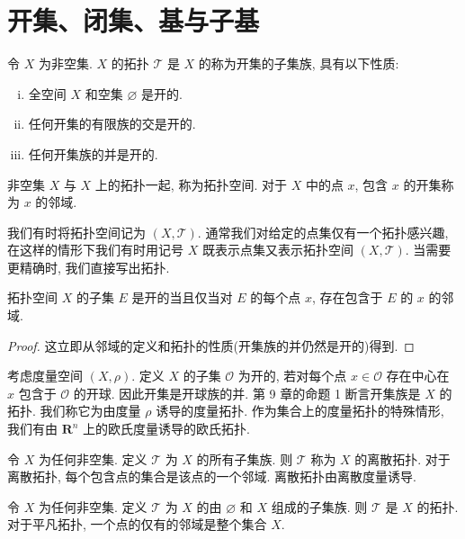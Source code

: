 \documentclass[../../main.tex]{subfiles}
\begin{document}
\section{开集、闭集、基与子基}\label{section:ch11-开集闭集基子基}

\begin{definition}[拓扑空间]\label{definition:ch11-拓扑空间}
令 $X$ 为非空集. $X$ 的拓扑 $\mathcal{T}$ 是 $X$ 的称为开集的子集族, 具有以下性质:
\begin{enumerate}[(i)]
\item 全空间 $X$ 和空集 $\varnothing$ 是开的.
\item 任何开集的有限族的交是开的.
\item 任何开集族的并是开的.
\end{enumerate}
非空集 $X$ 与 $X$ 上的拓扑一起, 称为拓扑空间. 对于 $X$ 中的点 $x$, 包含 $x$ 的开集称为 $x$ 的邻域.
\end{definition}

我们有时将拓扑空间记为 $(X,\mathcal{T})$. 通常我们对给定的点集仅有一个拓扑感兴趣, 在这样的情形下我们有时用记号 $X$ 既表示点集又表示拓扑空间 $(X,\mathcal{T})$. 当需要更精确时, 我们直接写出拓扑.

\begin{proposition}\label{proposition:ch11-开集邻域}
拓扑空间 $X$ 的子集 $E$ 是开的当且仅当对 $E$ 的每个点 $x$, 存在包含于 $E$ 的 $x$ 的邻域.
\end{proposition}

\begin{proof}
这立即从邻域的定义和拓扑的性质(开集族的并仍然是开的)得到.
\end{proof}

\begin{example}[度量拓扑]\label{example:ch11-度量拓扑}
考虑度量空间 $(X,\rho)$. 定义 $X$ 的子集 $\mathcal{O}$ 为开的, 若对每个点 $x\in\mathcal{O}$ 存在中心在 $x$ 包含于 $\mathcal{O}$ 的开球. 因此开集是开球族的并. 第 9 章的命题 1 断言开集族是 $X$ 的拓扑. 我们称它为由度量 $\rho$ 诱导的度量拓扑. 作为集合上的度量拓扑的特殊情形, 我们有由 $\mathbf{R}^{n}$ 上的欧氏度量诱导的欧氏拓扑.
\end{example}

\begin{example}[离散拓扑]\label{example:ch11-离散拓扑}
令 $X$ 为任何非空集. 定义 $\mathcal{T}$ 为 $X$ 的所有子集族. 则 $\mathcal{T}$ 称为 $X$ 的离散拓扑. 对于离散拓扑, 每个包含点的集合是该点的一个邻域. 离散拓扑由离散度量诱导.
\end{example}

\begin{example}[平凡拓扑]\label{example:ch11-平凡拓扑}
令 $X$ 为任何非空集. 定义 $\mathcal{T}$ 为 $X$ 的由 $\varnothing$ 和 $X$ 组成的子集族. 则 $\mathcal{T}$ 是 $X$ 的拓扑. 对于平凡拓扑, 一个点的仅有的邻域是整个集合 $X$.
\end{example}
\end{document}
